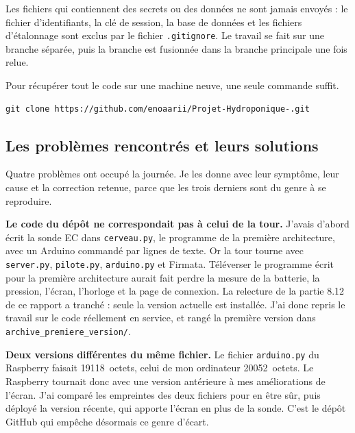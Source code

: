 Les fichiers qui contiennent des secrets ou des données ne sont jamais envoyés : le fichier d'identifiants, la clé de session, la base de données et les fichiers d'étalonnage sont exclus par le fichier \texttt{.gitignore}. Le travail se fait sur une branche séparée, puis la branche est fusionnée dans la branche principale une fois relue.

Pour récupérer tout le code sur une machine neuve, une seule commande suffit.

\begin{verbatim}
git clone https://github.com/enoaarii/Projet-Hydroponique-.git
\end{verbatim}

\subsection{Les problèmes rencontrés et leurs solutions}

Quatre problèmes ont occupé la journée. Je les donne avec leur symptôme, leur cause et la correction retenue, parce que les trois derniers sont du genre à se reproduire.

\textbf{Le code du dépôt ne correspondait pas à celui de la tour.} J'avais d'abord écrit la sonde EC dans \texttt{cerveau.py}, le programme de la première architecture, avec un Arduino commandé par lignes de texte. Or la tour tourne avec \texttt{server.py}, \texttt{pilote.py}, \texttt{arduino.py} et Firmata. Téléverser le programme écrit pour la première architecture aurait fait perdre la mesure de la batterie, la pression, l'écran, l'horloge et la page de connexion. La relecture de la partie 8.12 de ce rapport a tranché : seule la version actuelle est installée. J'ai donc repris le travail sur le code réellement en service, et rangé la première version dans \texttt{archive\_premiere\_version/}.

\textbf{Deux versions différentes du même fichier.} Le fichier \texttt{arduino.py} du Raspberry faisait \qty{19118}{octets}, celui de mon ordinateur \qty{20052}{octets}. Le Raspberry tournait donc avec une version antérieure à mes améliorations de l'écran. J'ai comparé les empreintes des deux fichiers pour en être sûr, puis déployé la version récente, qui apporte l'écran en plus de la sonde. C'est le dépôt GitHub qui empêche désormais ce genre d'écart.

